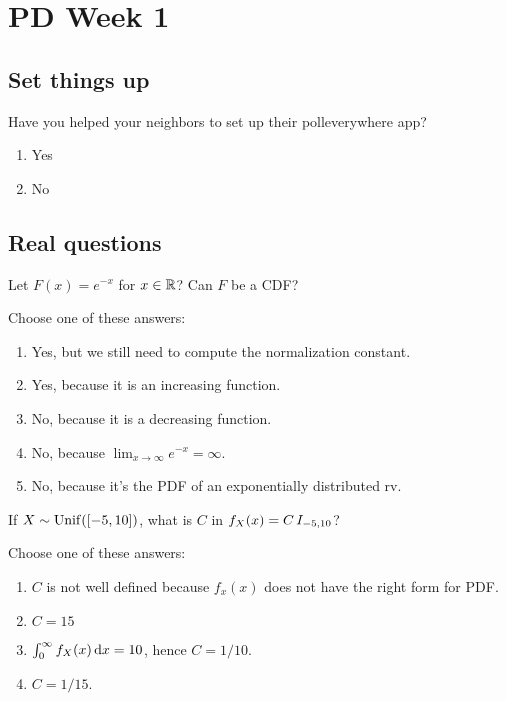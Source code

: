 \documentclass[poll_tutorial_format]{subfiles}
\begin{document}
\maketitle

\section{PD Week 1}

\subsection{Set things up}
\label{sec:set-things-up}



\setcounter{theorem}{-1}
\begin{exercise}
Have you helped your neighbors to set up their polleverywhere app?
\begin{enumerate}
\item Yes
\item No
\end{enumerate}
\end{exercise}

\subsection{Real questions}
\label{sec:start-real-questions}



\begin{exercise}
Let $F(x) = e^{-x}$ for $x\in \mathbb{R}$? Can $F$ be a CDF?

Choose one of these answers:
\begin{enumerate}
\item Yes, but we still need to compute the normalization constant.
\item Yes, because it is an increasing function.
\item No, because it is a decreasing function.
\item No, because $\lim_{x\to\infty} e^{-x}=\infty$.
\item No, because it's the PDF of an exponentially distributed rv.
\end{enumerate}
\end{exercise}


\begin{exercise}
If $X\sim  \mathrm{Unif}([-5, 10])$, what is $C$ in $f_{X}(x) = C \,I_{-5, 10}$?

Choose one of these answers:
\begin{enumerate}
\item $C$ is not well defined because $f_{x}(x)$ does not have the right form for PDF.
\item $C=15$
\item $\int_0^{\infty} f_{X}(x) \,\textrm{d}x = 10$, hence $C=1/10$.
\item $C=1/15$.
\end{enumerate}
\end{exercise}
\end{document}

